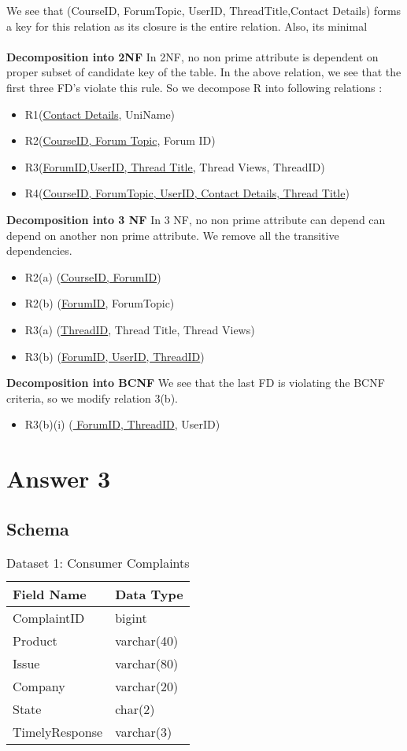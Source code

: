 \documentclass[10pt]{article}
\begin{document}
We see that (CourseID, ForumTopic, UserID, ThreadTitle,Contact Details) forms a  key for this relation as its closure is the entire relation. Also, its minimal\\
\\
\textbf{Decomposition into 2NF}
In 2NF, no non prime attribute is dependent on proper subset of candidate key of the table. In the above relation, we see that the first three FD's violate this rule. So we decompose R into following relations :
\begin{itemize}
\item R1(\underline{Contact Details}, UniName)
\item R2(\underline{CourseID, Forum Topic}, Forum ID)
\item R3(\underline{ForumID,UserID, Thread Title}, Thread Views, ThreadID)
\item R4(\underline{CourseID, ForumTopic, UserID, Contact Details, Thread Title})
\end{itemize}
\textbf{Decomposition into 3 NF}
In 3 NF, no non prime attribute can depend can depend on another non prime attribute. We remove all the transitive dependencies.
\begin{itemize}
\item R2(a) (\underline{CourseID, ForumID})
\item R2(b) (\underline{ForumID}, ForumTopic)
\item R3(a) (\underline{ThreadID}, Thread Title, Thread Views)
\item R3(b) (\underline{ForumID, UserID, ThreadID})
\end{itemize}
\textbf{Decomposition into BCNF}
We see that the last FD is violating the BCNF criteria, so we modify relation 3(b).
\begin{itemize}
\item R3(b)(i) (\underline{ ForumID, ThreadID}, UserID)
\end{itemize}

\section{Answer 3}
\subsection{Schema}
\begin{table}[h!]
\centering
\caption{Dataset 1: Consumer Complaints}
  \label{tab:table}
  \vspace{5mm}
  \begin{tabular}{|p{4cm}|p{4cm}|}
  \hline
  Field Name & Data Type\\
  \hline
  ComplaintID & bigint\\
  \hline
  Product & varchar(40)\\
  \hline
  Issue & varchar(80)\\
  \hline
  Company & varchar(20)\\
  \hline
  State & char(2)\\
  \hline
  TimelyResponse & varchar(3)\\
  \hline
  \end{tabular}
\end{table}
\end{document}
